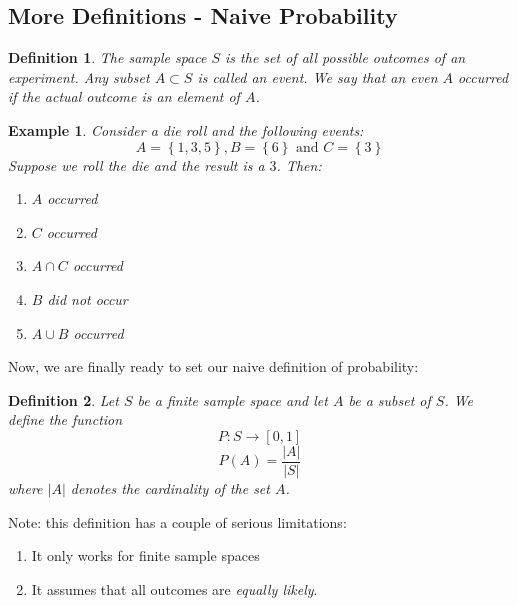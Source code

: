 \documentclass[12pt]{article} %
\newtheorem{defn}{Definition}
\newtheorem{example}{Example}
\begin{document}
\subsection{More Definitions - Naive Probability}
\begin{defn}
The \emph{sample space} $S$ is the set of all possible outcomes of an experiment. Any subset $A\subset S$ is called an \emph{event}. We say that an even $A$ \emph{occurred} if the actual outcome is an element of $A$.
\end{defn}
\begin{example}
Consider a die roll and the following events:
$$A = \left\{1,3,5\right\}, B=\left\{6\right\}\textrm{ and } C=\left\{3\right\}$$
Suppose we roll the die and the result is a $3$. Then:
\begin{enumerate}
\item $A$ occurred
\item $C$ occurred
\item $A\cap C$ occurred
\item $B$ did not occur
\item $A\cup B$ occurred 
\end{enumerate}
\end{example}
Now, we are finally ready to set our naive definition of probability:
\begin{defn}
Let $S$ be a finite sample space and let $A$ be a subset of $S$. We define the function
$$P:S\rightarrow \left[ 0,1\right]$$
$$P(A) = \frac{|A|}{|S|}$$
where $|A|$ denotes the cardinality of the set $A$.
\end{defn}
Note: this definition has a couple of serious limitations:
\begin{enumerate}
\item It only works for finite sample spaces
\item It assumes that all outcomes are \emph{equally likely}.
\end{enumerate}
\end{document}
